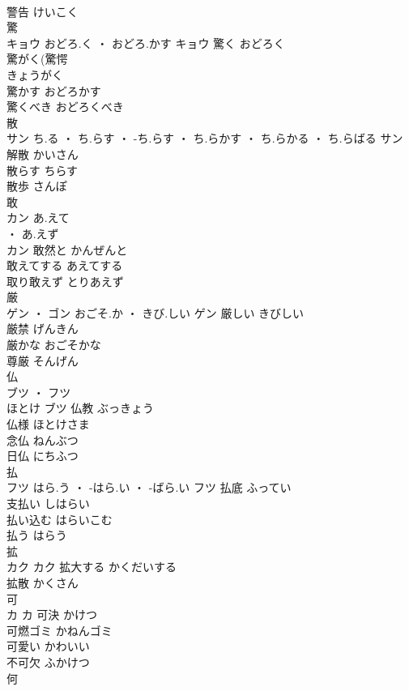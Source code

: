 \documentclass[8pt]{extreport}
\begin{document}
\begin{CJK}{UTF8}{min}
\\	警告	けいこく	
\\	驚	
\\	キョウ	おどろ.く ・ おどろ.かす	キョウ	驚く	おどろく	
\\	驚がく(驚愕
\\	きょうがく	
\\	驚かす	おどろかす	
\\	驚くべき	おどろくべき	
\\	散	
\\	サン	ち.る ・ ち.らす ・ -ち.らす ・ ち.らかす ・ ち.らかる ・ ち.らばる	サン	解散	かいさん	
\\	散らす	ちらす	
\\	散歩	さんぽ	
\\	敢	
\\	カン	あ.えて
\\	・ あ.えず
\\	カン	敢然と	かんぜんと	
\\	敢えてする	あえてする	
\\	取り敢えず	とりあえず	
\\	厳	
\\	ゲン ・ ゴン	おごそ.か ・ きび.しい	ゲン	厳しい	きびしい	
\\	厳禁	げんきん	
\\	厳かな	おごそかな	
\\	尊厳	そんげん	
\\	仏	
\\	ブツ ・ フツ
\\	ほとけ	ブツ	仏教	ぶっきょう	
\\	仏様	ほとけさま	
\\	念仏	ねんぶつ	
\\	日仏	にちふつ	
\\	払	
\\	フツ	はら.う ・ -はら.い ・ -ばら.い	フツ	払底	ふってい	
\\	支払い	しはらい	
\\	払い込む	はらいこむ	
\\	払う	はらう	
\\	拡	
\\	カク		カク	拡大する	かくだいする	
\\	拡散	かくさん	
\\	可	
\\	カ		カ	可決	かけつ	
\\	可燃ゴミ	かねんゴミ	
\\	可愛い	かわいい	
\\	不可欠	ふかけつ	
\\	何	

\end{CJK}
\end{document}
